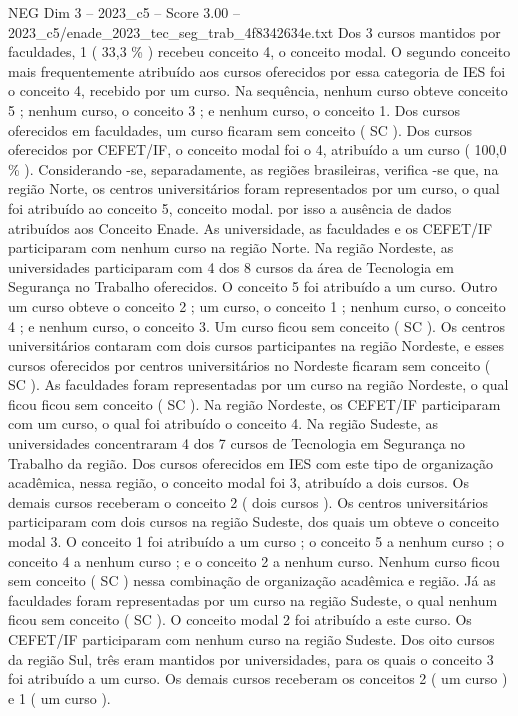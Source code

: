\begin{textsample}{NEG Dim 3 – 2023\_c5 – Score 3.00 – 2023\_c5/enade\_2023\_tec\_seg\_trab\_4f8342634e.txt}
Dos 3 cursos mantidos por faculdades, 1 ( 33,3 \% ) recebeu conceito 4, o conceito modal.
O segundo conceito mais frequentemente atribuído aos cursos oferecidos por essa categoria de IES foi o conceito 4, recebido por um curso.
Na sequência, nenhum curso obteve conceito 5 ; nenhum curso, o conceito 3 ; e nenhum curso, o conceito 1.
Dos cursos oferecidos em faculdades, um curso ficaram sem conceito ( SC ).
Dos cursos oferecidos por CEFET/IF, o conceito modal foi o 4, atribuído a um curso ( 100,0 \% ).
Considerando -se, separadamente, as regiões brasileiras, verifica -se que, na região Norte, os centros universitários foram representados por um curso, o qual foi atribuído ao conceito 5, conceito modal. por isso a ausência de dados atribuídos aos Conceito Enade.
As universidade, as faculdades e os CEFET/IF participaram com nenhum curso na região Norte.
Na região Nordeste, as universidades participaram com 4 dos 8 cursos da área de Tecnologia em Segurança no Trabalho oferecidos.
O conceito 5 foi atribuído a um curso.
Outro um curso obteve o conceito 2 ; um curso, o conceito 1 ; nenhum curso, o conceito 4 ; e nenhum curso, o conceito 3.
Um curso ficou sem conceito ( SC ).
Os centros universitários contaram com dois cursos participantes na região Nordeste, e esses cursos oferecidos por centros universitários no Nordeste ficaram sem conceito ( SC ).
As faculdades foram representadas por um curso na região Nordeste, o qual ficou ficou sem conceito ( SC ).
Na região Nordeste, os CEFET/IF participaram com um curso, o qual foi atribuído o conceito 4.
Na região Sudeste, as universidades concentraram 4 dos 7 cursos de Tecnologia em Segurança no Trabalho da região.
Dos cursos oferecidos em IES com este tipo de organização acadêmica, nessa região, o conceito modal foi 3, atribuído a dois cursos.
Os demais cursos receberam o conceito 2 ( dois cursos ).
Os centros universitários participaram com dois cursos na região Sudeste, dos quais um obteve o conceito modal 3.
O conceito 1 foi atribuído a um curso ; o conceito 5 a nenhum curso ; o conceito 4 a nenhum curso ; e o conceito 2 a nenhum curso.
Nenhum curso ficou sem conceito ( SC ) nessa combinação de organização acadêmica e região.
Já as faculdades foram representadas por um curso na região Sudeste, o qual nenhum ficou sem conceito ( SC ).
O conceito modal 2 foi atribuído a este curso.
Os CEFET/IF participaram com nenhum curso na região Sudeste.
Dos oito cursos da região Sul, três eram mantidos por universidades, para os quais o conceito 3 foi atribuído a um curso.
Os demais cursos receberam os conceitos 2 ( um curso ) e 1 ( um curso ).

\end{textsample}

